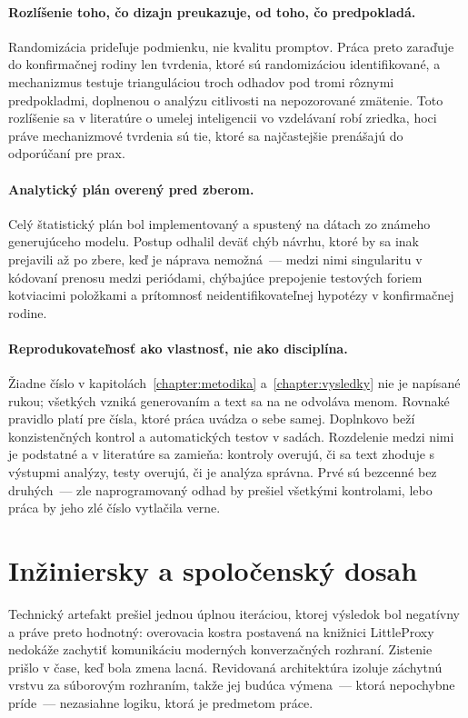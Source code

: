 \paragraph{Rozlíšenie toho, čo dizajn preukazuje, od toho, čo predpokladá.} Randomizácia prideľuje podmienku, nie kvalitu promptov. Práca preto zaraďuje do konfirmačnej rodiny len tvrdenia, ktoré sú randomizáciou identifikované, a mechanizmus testuje trianguláciou troch odhadov pod tromi rôznymi predpokladmi, doplnenou o analýzu citlivosti na nepozorované zmätenie. Toto rozlíšenie sa v literatúre o umelej inteligencii vo vzdelávaní robí zriedka, hoci práve mechanizmové tvrdenia sú tie, ktoré sa najčastejšie prenášajú do odporúčaní pre prax.

\paragraph{Analytický plán overený pred zberom.} Celý štatistický plán bol implementovaný a spustený na dátach zo známeho generujúceho modelu. Postup odhalil deväť chýb návrhu, ktoré by sa inak prejavili až po zbere, keď je náprava nemožná~--- medzi nimi singularitu v kódovaní prenosu medzi periódami, chýbajúce prepojenie testových foriem kotviacimi položkami a prítomnosť neidentifikovateľnej hypotézy v konfirmačnej rodine.

\paragraph{Reprodukovateľnosť ako vlastnosť, nie ako disciplína.} Žiadne číslo v kapitolách~\ref{chapter:metodika} a~\ref{chapter:vysledky} nie je napísané rukou; všetkých \repoMacros{} vzniká generovaním a text sa na ne odvoláva menom. Rovnaké pravidlo platí pre čísla, ktoré práca uvádza o sebe samej. Doplnkovo beží \repoChecks{} konzistenčných kontrol a \repoTests{} automatických testov v \repoSuites{} sadách. Rozdelenie medzi nimi je podstatné a v literatúre sa zamieňa: kontroly overujú, či sa text zhoduje s výstupmi analýzy, testy overujú, či je analýza správna. Prvé sú bezcenné bez druhých~--- zle naprogramovaný odhad by prešiel všetkými kontrolami, lebo práca by jeho zlé číslo vytlačila verne.

\section{Inžiniersky a spoločenský dosah}

Technický artefakt prešiel jednou úplnou iteráciou, ktorej výsledok bol negatívny a práve preto hodnotný: overovacia kostra postavená na knižnici LittleProxy nedokáže zachytiť komunikáciu moderných konverzačných rozhraní. Zistenie prišlo v čase, keď bola zmena lacná. Revidovaná architektúra izoluje záchytnú vrstvu za súborovým rozhraním, takže jej budúca výmena~--- ktorá nepochybne príde~--- nezasiahne logiku, ktorá je predmetom práce.


